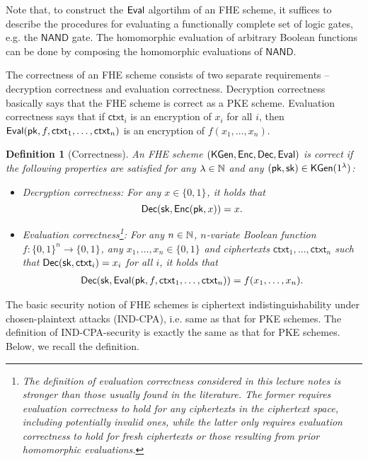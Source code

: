 \documentclass[10pt,twoside]{article}
\newtheorem{definition}[theorem]{Definition}
\newcommand{\ctxt}{\mathsf{ctxt}}
\newcommand{\bits}[1][]{\{0,1\}^{#1}}
\renewcommand{\NAND}{\mathsf{NAND}}
\begin{document}
Note that, to construct the $\mathsf{Eval}$ algortihm of an FHE scheme, it suffices to describe the procedures for evaluating a functionally complete set of logic gates, e.g. the $\NAND$ gate.
The homomorphic evaluation of arbitrary Boolean functions can be done by composing the homomorphic evaluations of $\NAND$.

The correctness of an FHE scheme consists of two separate requirements -- decryption correctness and evaluation correctness.
Decryption correctness basically says that the FHE scheme is correct as a PKE scheme.
Evaluation correctness says that if $\ctxt_i$ is an encryption of $x_i$ for all $i$, then $\eval(\pk, f, \ctxt_1, \ldots, \ctxt_n)$ is an encryption of $f(x_1, \ldots, x_n)$.

\begin{definition}[Correctness]
    An FHE scheme $(\mathsf{KGen},\mathsf{Enc},\mathsf{Dec},\mathsf{Eval})$ is correct if the following properties are satisfied for any $\lambda \in \mathbb{N}$ and any $(\pk, \sk) \in \kgen(\secparam)$:
    \begin{itemize}
        \item Decryption correctness: For any $x \in \bits$, it holds that
        \[\dec(\sk, \enc(\pk, x)) = x.\]
        \item Evaluation correctness\footnote{The definition of evaluation correctness considered in this lecture notes is stronger than those usually found in the literature. The former requires evaluation correctness to hold for any ciphertexts in the ciphertext space, including potentially invalid ones, while the latter only requires evaluation correctness to hold for fresh ciphertexts or those resulting from prior homomorphic evaluations.}: For any $n \in \mathbb{N}$, $n$-variate Boolean function $f: \bits[n] \to \bits$, any $x_1, \ldots, x_n \in \bits$ and ciphertexts $\ctxt_1, \ldots, \ctxt_n$ such that $\dec(\sk,\ctxt_i) = x_i$ for all $i$, it holds that
        \begin{align*}
            \dec(\sk, \eval(\pk, f , \ctxt_1, \ldots, \ctxt_n)) = f(x_1, \ldots, x_n).
        \end{align*}
    \end{itemize}
\end{definition}

The basic security notion of FHE schemes is ciphertext indistinguishability under chosen-plaintext attacks (IND-CPA), i.e. same as that for PKE schemes.
The definition of IND-CPA-security is exactly the same as that for PKE schemes.
Below, we recall the definition.
\end{document}
